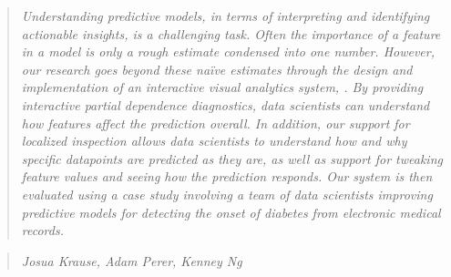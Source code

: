\begin{quote}\textit{
Understanding predictive models, in terms of interpreting and identifying actionable
insights, is a challenging task.
Often the importance of a feature in a model is only a rough estimate
condensed into one number.  However, our research goes beyond these na\"ive estimates through the design and implementation of an interactive visual analytics system,
\prospector. By providing interactive partial dependence diagnostics, data scientists can understand how features affect the prediction overall.  In addition, our support for localized inspection allows data scientists to understand how and why specific datapoints are predicted as they are, as well as support for  tweaking feature values and seeing how the prediction responds.  Our system is then evaluated using a case study involving a team of data scientists improving predictive models for detecting the onset of diabetes from electronic medical records.
}\end{quote}

\begin{quote}
\textit{Josua Krause, Adam Perer, Kenney Ng}
\end{quote}










% 
% 

% 

